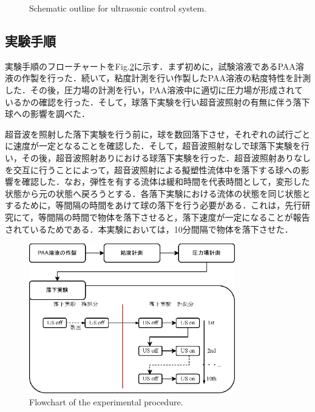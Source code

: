 \begin{figure}[h]
    \centering
    \caption{Schematic outline for ultrasonic control system.}
    \label{fig:connect-with-signal}
\end{figure}

\subsection{実験手順}

実験手順のフローチャートをFig.\ref{fig:exp-methods}に示す．まず初めに，試験溶液であるPAA溶液の作製を行った．続いて，粘度計測を行い作製したPAA溶液の粘度特性を計測した．その後，圧力場の計測を行い，PAA溶液中に適切に圧力場が形成されているかの確認を行った．そして，球落下実験を行い超音波照射の有無に伴う落下球への影響を調べた．

超音波を照射した落下実験を行う前に，球を数回落下させ，それぞれの試行ごとに速度が一定となることを確認した．そして，超音波照射なしで球落下実験を行い，その後，超音波照射ありにおける球落下実験を行った．超音波照射ありなしを交互に行うことによって，超音波照射による擬塑性流体中を落下する球への影響を確認した．なお，弾性を有する流体は緩和時間を代表時間として，変形した状態から元の状態へ戻ろうとする．各落下実験における流体の状態を同じ状態とするために，等間隔の時間をあけて球の落下を行う必要がある．これは，先行研究\cite{ref:8-5}にて，等間隔の時間で物体を落下させると，落下速度が一定になることが報告されているためである．本実験においては，10分間隔で物体を落下させた．

\begin{figure}[ht]
    \centering
    \includegraphics[width=0.8\textwidth]{2-Methods/exp-methods.eps}
    \caption{Flowchart of the experimental procedure.}
    \label{fig:exp-methods}
\end{figure}
